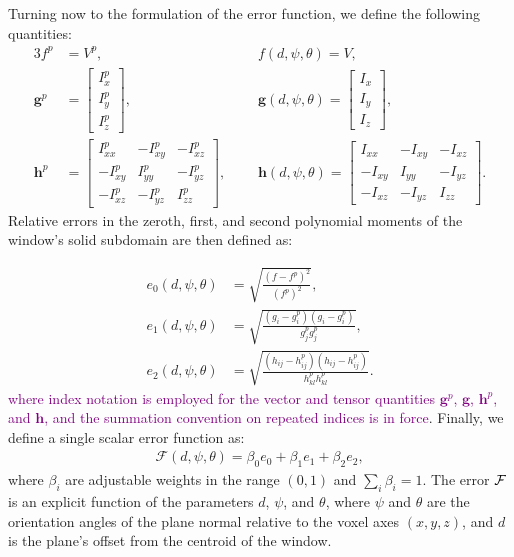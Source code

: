 Turning now to the formulation of the error function, we define the following quantities:
\begin{alignat}{3}
f^p &= V^p, \text{\ \ \ \ \ }&&f(d,\psi,\theta) = V, \\
\bm{g}^p &= \left[\begin{array} {ccc} {I_x^p} \\ {I_y^p} \\ {I_z^p} \end{array} \right], \text{\ \ \ \ \ }&&\bm{g}(d,\psi,\theta) = \left[\begin{array} {ccc} {I_x} \\ {I_y} \\ {I_z} \end{array} \right], \\
\bm{h}^p &= \left[\begin{array} {ccc} {I_{xx}^p} & {-I_{xy}^p} & {-I_{xz}^p}\\ {-I_{xy}^p} & {I_{yy}^p} & {-I_{yz}^p} \\ -{I_{xz}^p} & {-I_{yz}^p} & {I_{zz}^p} \end{array} \right],\text{\ \ \ \ \ \ \ }&&\bm{h}(d,\psi,\theta) = \left[\begin{array} {ccc} {I_{xx}} & {-I_{xy}} & {-I_{xz}}\\ {-I_{xy}} & {I_{yy}} & {-I_{yz}} \\ -{I_{xz}} & {-I_{yz}} & {I_{zz}} \end{array} \right].
\end{alignat}
Relative errors in the zeroth, first, and second polynomial moments of the window's solid subdomain are then defined as:

\begin{align}
e_0(d,\psi,\theta) &=  \sqrt{\frac{(f - f^p)^2}{(f^p)^2}}, \\
e_1(d,\psi,\theta) &=  \sqrt{\frac{(g_i - g_i^p)(g_i - g_i^p)}{g_j^{p}g_j^{p}}}, \\
e_2(d,\psi,\theta) &=  \sqrt{\frac{(h_{ij} - h_{ij}^p)(h_{ij} - h_{ij}^p)}{h_{kl}^{p}h_{kl}^{p}}}.
\end{align}
\textcolor{purple}{where index notation is employed for the vector and tensor quantities $\bm{g}^p$, $\bm{g}$, $\bm{h}^p$, and $\bm{h}$, and the summation convention on repeated indices is in force}. Finally, we define a single scalar error function as:
\begin{align}
\label{obj func}
\mathcal{F}(d,\psi,\theta) = \beta_0e_0 + \beta_1e_1 + \beta_2e_2,
\end{align}
where $\beta_i$ are adjustable weights in the range $(0,1)$ and $\sum \limits_i\beta_i = 1$.  The error $\mathcal{F}$ is an explicit function of the parameters $d$, $\psi$, and $\theta$, where $\psi$ and $\theta$ are the orientation angles of the plane normal relative to the voxel axes $(x, y, z)$, and $d$ is the plane's offset from the centroid of the window.

